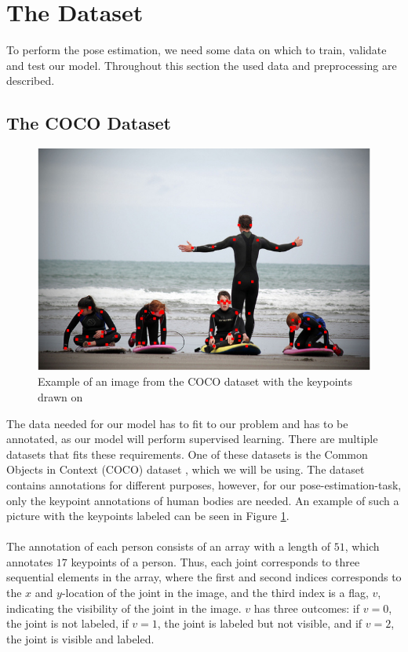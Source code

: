 \documentclass[./main.tex]{subfiles}
\begin{document}
\section{The Dataset}
To perform the pose estimation, we need some data on which to train, validate and test our model. Throughout this section the used data and preprocessing are described.

\subsection{The COCO Dataset}
\begin{figure}[t]
    \centering
    \includegraphics[height = 4 cm]{./entities/coco_example.png}
    \caption{Example of an image from the COCO dataset with the keypoints drawn on \cite{COCO_article}}
    \label{fig:coco_example}
\end{figure}
\noindent The data needed for our model has to fit to our problem and has to be annotated, as our model will perform supervised learning. There are multiple datasets that fits these requirements. One of these datasets is the Common Objects in Context (COCO) dataset \cite{COCO_article}, which we will be using. The dataset contains annotations for different purposes, however, for our pose-estimation-task, only the keypoint annotations of human bodies are needed. An example of such a picture with the keypoints labeled can be seen in Figure \ref{fig:coco_example}. 
\\
\\
The annotation of each person consists of an array with a length of $51$, which annotates $17$ keypoints of a person. Thus, each joint corresponds to three sequential elements in the array, where the first and second indices corresponds to the $x$ and $y$-location of the joint in the image, and the third index is a flag, $v$, indicating the visibility of the joint in the image. $v$ has three outcomes: if $v = 0$, the joint is not labeled, if $v = 1$, the joint is labeled but not visible, and if $v = 2$, the joint is visible and labeled. 
\end{document}
